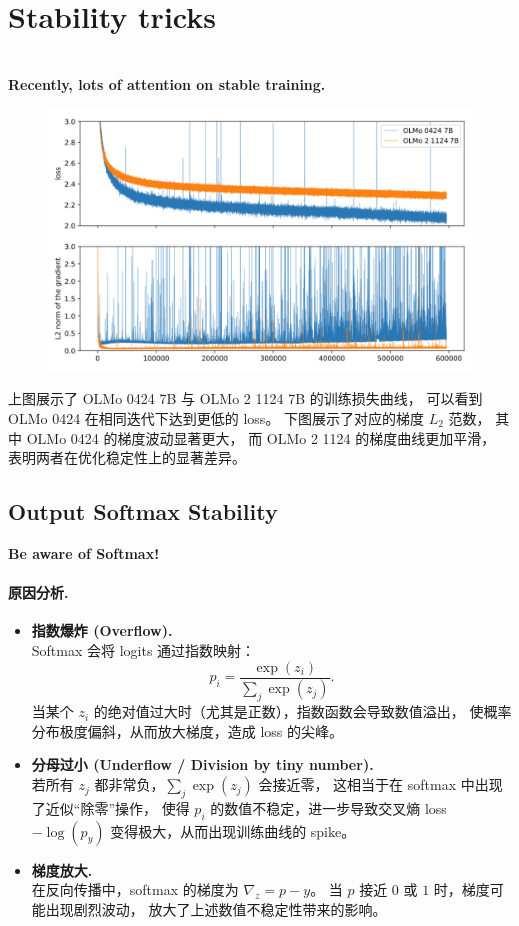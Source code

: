 \clearpage
{\chaptoc\noindent\begin{minipage}[inner sep=0,outer sep=0]{0.9\linewidth}\section{Stability tricks}\end{minipage}}
\\
\textbf{Recently, lots of attention on stable training.}


\begin{figure}[htbp]
  \centering
  \includegraphics[width=0.7\linewidth]{figs/lec3/lec3.30.png}
\end{figure}

上图展示了 OLMo 0424 7B 与 OLMo 2 1124 7B 的训练损失曲线，
可以看到 OLMo 0424 在相同迭代下达到更低的 loss。
下图展示了对应的梯度 $L_2$ 范数，
其中 OLMo 0424 的梯度波动显著更大，
而 OLMo 2 1124 的梯度曲线更加平滑，
表明两者在优化稳定性上的显著差异。

\subsection{Output Softmax Stability}

{\textbf{Be aware of Softmax! }}

\paragraph{原因分析.}
\begin{itemize}
    \item \textbf{指数爆炸 (Overflow).}  \\
    Softmax 会将 logits 通过指数映射：
    \[
        p_i = \frac{\exp(z_i)}{\sum_j \exp(z_j)}.
    \]
    当某个 $z_i$ 的绝对值过大时（尤其是正数），指数函数会导致数值溢出，
    使概率分布极度偏斜，从而放大梯度，造成 loss 的尖峰。
    
    \item \textbf{分母过小 (Underflow / Division by tiny number).}  \\
    若所有 $z_j$ 都非常负，$\sum_j \exp(z_j)$ 会接近零，
    这相当于在 softmax 中出现了近似“除零”操作，
    使得 $p_i$ 的数值不稳定，进一步导致交叉熵 loss$-\log(p_{y})$ 变得极大，从而出现训练曲线的 spike。
    
    \item \textbf{梯度放大.}  \\
    在反向传播中，softmax 的梯度为 $\nabla_z = p - y$。
    当 $p$ 接近 $0$ 或 $1$ 时，梯度可能出现剧烈波动，
    放大了上述数值不稳定性带来的影响。
\end{itemize}

